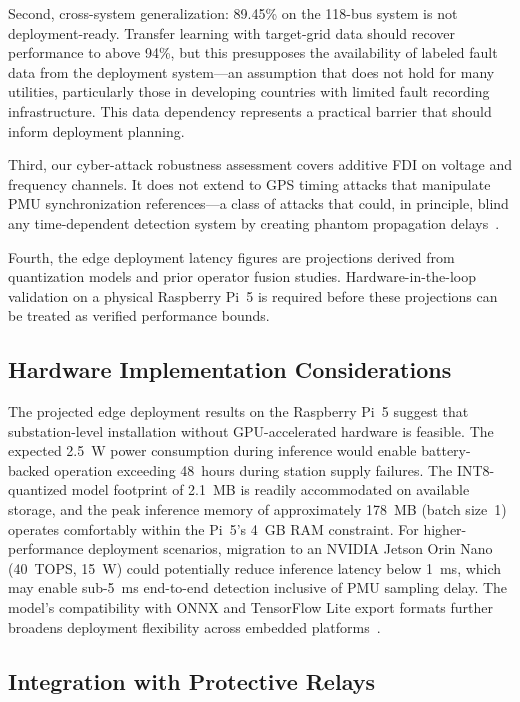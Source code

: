 \documentclass[journal]{IEEEtran}
\begin{document}
Second, cross-system generalization: 89.45\% on the 118-bus system is not deployment-ready. Transfer learning with target-grid data should recover performance to above 94\%, but this presupposes the availability of labeled fault data from the deployment system---an assumption that does not hold for many utilities, particularly those in developing countries with limited fault recording infrastructure. This data dependency represents a practical barrier that should inform deployment planning.

Third, our cyber-attack robustness assessment covers additive FDI on voltage and frequency channels. It does not extend to GPS timing attacks that manipulate PMU synchronization references---a class of attacks that could, in principle, blind any time-dependent detection system by creating phantom propagation delays~\cite{ref13}.

Fourth, the edge deployment latency figures are projections derived from quantization models and prior operator fusion studies. Hardware-in-the-loop validation on a physical Raspberry Pi~5 is required before these projections can be treated as verified performance bounds.

\subsection{Hardware Implementation Considerations}

The projected edge deployment results on the Raspberry Pi~5 suggest that substation-level installation without GPU-accelerated hardware is feasible. The expected 2.5~W power consumption during inference would enable battery-backed operation exceeding 48~hours during station supply failures. The INT8-quantized model footprint of 2.1~MB is readily accommodated on available storage, and the peak inference memory of approximately 178~MB (batch size~1) operates comfortably within the Pi~5's 4~GB RAM constraint. For higher-performance deployment scenarios, migration to an NVIDIA Jetson Orin Nano (40~TOPS, 15~W) could potentially reduce inference latency below 1~ms, which may enable sub-5~ms end-to-end detection inclusive of PMU sampling delay. The model's compatibility with ONNX and TensorFlow Lite export formats further broadens deployment flexibility across embedded platforms~\cite{ref29,ref30}.

\subsection{Integration with Protective Relays}
\end{document}
